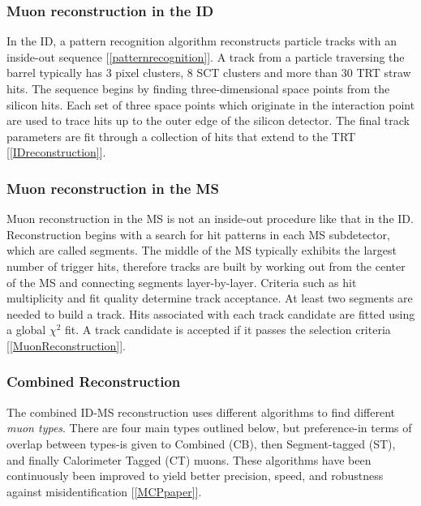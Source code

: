 \subsubsection{Muon reconstruction in the ID}
In the ID, a pattern recognition algorithm reconstructs particle tracks with an inside-out sequence [\ref{patternrecognition}]. A track from a particle traversing the barrel typically has 3 pixel clusters, 8 SCT clusters and more than 30 TRT straw hits. The sequence begins by finding three-dimensional space points from the silicon hits. Each set of three space points which originate in the  interaction point are used to trace hits up to the outer edge of the silicon detector. The final track parameters are fit through a collection of hits that extend to the TRT [\ref{IDreconstruction}].

\subsubsection{Muon reconstruction in the MS}
Muon reconstruction in the MS is not an inside-out procedure like that in the ID. Reconstruction begins with a search for hit patterns in each MS subdetector, which are called segments. The middle of the MS typically exhibits the largest number of trigger hits, therefore tracks are built by working out from the center of the MS and connecting segments layer-by-layer. Criteria such as hit multiplicity and fit quality determine track acceptance. At least two segments are needed to build a track. Hits associated with each track candidate are fitted using a global $\chi^2$ fit. A track candidate is accepted if it passes the selection criteria [\ref{MuonReconstruction}]. 

\subsubsection{Combined Reconstruction}
The combined ID-MS reconstruction uses different algorithms to find different \textit{muon types}. There are four main types outlined below, but preference-in terms of overlap between types-is given to Combined (CB), then Segment-tagged (ST), and finally Calorimeter Tagged (CT) muons. These algorithms have been continuously been improved to yield better precision, speed, and robustness against misidentification [\ref{MCPpaper}].  

